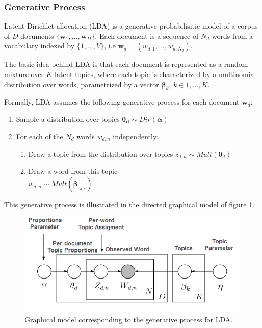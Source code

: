 \documentclass{article}
\begin{document}
\subsubsection{Generative Process}
Latent Dirichlet allocation (LDA) is a generative probabilisitic model of a corpus of $D$ documents $\{\mathbf{w}_1,..., \mathbf{w}_D\}$. Each document is a sequence of $N_d$ words from a vocabulary indexed by $\{1,...,V\}$, i.e $\mathbf{w}_d = (w_{d,1},...,w_{d,N_d})$.

The basic idea behind LDA is that each document is represented as a random mixture over $K$ latent topics, where each topic is characterized by a multinomial distribution over words, parametrized by a vector $\bm{\beta}_{k}$, $k \in {1,...,K}$. 

Formally, LDA assumes the following generative process for each document $\mathbf{w}_d$:
\begin{enumerate}
\item Sample a distribution over topics $\bm{\theta_d} \sim Dir(\bm{\alpha})$
\item For each of the $N_d$ words $w_{d,n}$ independently:
\begin{enumerate}
\item Draw a topic from the distribution over topics $z_{d,n} \sim Mult(\bm{\theta}_d)$
\item Draw a word from this topic \\ 
$w_{d,n} \sim Mult(\bm{\beta}_{z_{d,n}})$
\end{enumerate}
\end{enumerate}
This generative process is illustrated in the directed graphical model of figure \ref{graph_model}.

\begin{figure}[ht]
\vskip 0.2in
\begin{center}
\centerline{\includegraphics[width=\columnwidth]{LDA_graph_model}}
\caption{Graphical model corresponding to the generative process for LDA.}
\label{graph_model}
\end{center}
\vskip -0.2in
\end{figure} 
\end{document}
